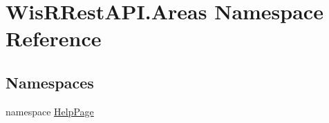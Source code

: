 \hypertarget{namespace_wis_r_rest_a_p_i_1_1_areas}{}\section{Wis\+R\+Rest\+A\+P\+I.\+Areas Namespace Reference}
\label{namespace_wis_r_rest_a_p_i_1_1_areas}
\subsection*{Namespaces}
\begin{DoxyCompactItemize}
\item 
namespace \hyperlink{namespace_wis_r_rest_a_p_i_1_1_areas_1_1_help_page}{Help\+Page}
\end{DoxyCompactItemize}
